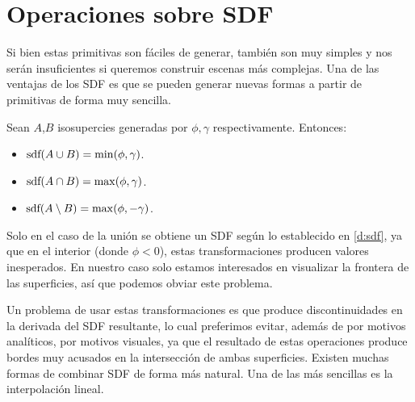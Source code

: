 \section{Operaciones sobre SDF}
Si bien estas primitivas son fáciles de generar, también son muy simples y nos serán insuficientes si queremos construir escenas más complejas. Una de las ventajas de los SDF es que se pueden generar nuevas formas a partir de primitivas de forma muy sencilla.

\begin{proposicion}
    Sean $A$,$B$ isosupercies generadas por $\phi,\gamma$ respectivamente. Entonces:
    \begin{itemize}
        \item $\text{sdf}(A\cup B) = \min(\phi, \gamma)$.
        \item $\text{sdf}(A\cap B) = \max(\phi, \gamma)$.
        \item $\text{sdf}(A\setminus B) = \max(\phi, -\gamma)$.
    \end{itemize}
\end{proposicion}

\begin{observacion}
    Solo en el caso de la unión se obtiene un SDF según lo establecido en \autoref{d:sdf}, ya que en el interior (donde $\phi < 0$), estas transformaciones producen valores inesperados. En nuestro caso solo estamos interesados en visualizar la frontera de las superficies, así que podemos obviar este problema.
\end{observacion}

Un problema de usar estas transformaciones es que produce discontinuidades en la derivada del SDF resultante, lo cual preferimos evitar, además de por motivos analíticos, por motivos visuales, ya que el resultado de estas operaciones produce bordes muy acusados en la intersección de ambas superficies. Existen muchas formas de combinar SDF de forma más natural. Una de las más sencillas es la interpolación lineal.

